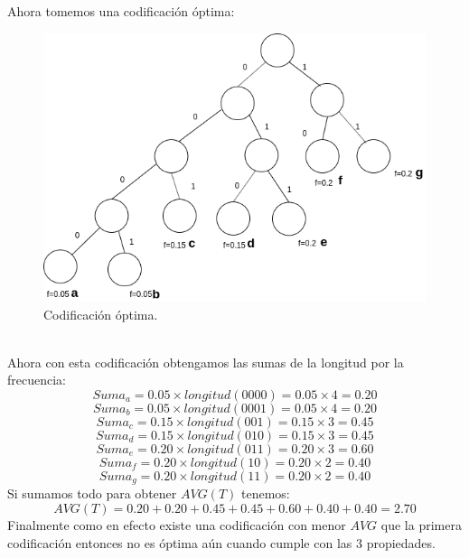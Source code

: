 \documentclass[12pt]{article}
\begin{document}
\subsection{}
Ahora tomemos una codificación óptima:
\begin{figure}[h]
	\begin{center}
		\includegraphics[scale=0.7]{codificacion2}
	\end{center}
	\caption{Codificación óptima.}
\end{figure}
\\
Ahora con esta codificación obtengamos las sumas de la longitud por la frecuencia:
\begin{equation}
Suma_a = 0.05 \times longitud(0000) = 0.05 \times 4 = 0.20
\end{equation}
\begin{equation}
Suma_b = 0.05 \times longitud(0001) = 0.05 \times 4 = 0.20
\end{equation}
\begin{equation}
Suma_c = 0.15 \times longitud(001) = 0.15 \times 3 = 0.45
\end{equation}
\begin{equation}
Suma_d = 0.15 \times longitud(010) = 0.15 \times 3 = 0.45
\end{equation}
\begin{equation}
Suma_e = 0.20 \times longitud(011) = 0.20 \times 3 = 0.60
\end{equation}
\begin{equation}
Suma_f = 0.20 \times longitud(10) = 0.20 \times 2 = 0.40
\end{equation}
\begin{equation}
Suma_g = 0.20 \times longitud(11) = 0.20 \times 2 = 0.40
\end{equation}
Si sumamos todo para obtener $AVG(T)$ tenemos:
\begin{equation}
AVG(T)= 0.20 + 0.20 + 0.45  + 0.45 + 0.60  + 0.40 + 0.40= 2.70
\end{equation}
Finalmente como en efecto existe una codificación con menor $AVG$ que la primera codificación entonces no es óptima aún cuando cumple con las 3 propiedades.
\end{document}
